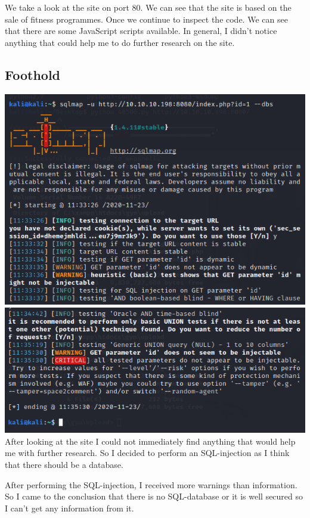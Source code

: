 \documentclass[../main.tex]{subfiles}
\begin{document}
We take a look at the site on port 80. We can see that the site is based on the sale of fitness programmes. Once we continue to inspect the code. We can see that there are some JavaScript scripts available. In general, I didn't notice anything that could help me to do further research on the site. 

\subsection{Foothold}

\includegraphics[width=\linewidth]{images/Boyan/HackTheBox_4_sql_Boyan.PNG}
\includegraphics[width=\linewidth]{images/Boyan/HackTheBox_4.1_sql_Boyan.PNG}
After looking at the site I could not immediately find anything that would help me with further research. So I decided to perform an SQL-injection as I think that there should be a database.

After performing the SQL-injection, I received more warnings than information. So I came to the conclusion that there is no SQL-database or it is well secured so I can't get any information from it.
\end{document}
